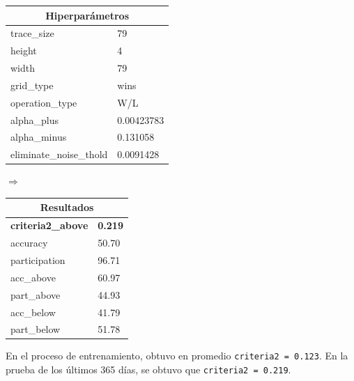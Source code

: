 \documentclass[11pt]{article}
\begin{document}
\begin{table}[H]
    \centering
    \begin{tabular}{|ll|}
        \hline
        \multicolumn{2}{|c|}{Hiperparámetros} \\
        \hline
        trace\_size            &          79 \\
        height                &           4 \\
        width                 &          79 \\
        grid\_type             &        wins \\
        operation\_type        &         W/L \\
        alpha\_plus            &  0.00423783 \\
        alpha\_minus           &    0.131058 \\
        eliminate\_noise\_thold &   0.0091428 \\
        \hline
        \end{tabular}
    $\Rightarrow$
    \begin{tabular}{|ll|}
        \hline
        \multicolumn{2}{|c|}{Resultados}\\
        \hline
        \textbf{criteria2\_above} & \textbf{0.219} \\
        accuracy            &         50.70 \\
        participation                &          96.71 \\
        acc\_above                 &         60.97 \\
        part\_above             &       44.93 \\
        acc\_below        &        41.79 \\
        part\_below            &    51.78 \\
        \hline
        \end{tabular}
\end{table}
En el proceso de entrenamiento, obtuvo en promedio \texttt{criteria2 = 0.123}. En la prueba de los últimos 365 días, se obtuvo que  \texttt{criteria2 = 0.219}.
\end{document}
